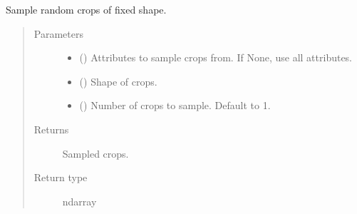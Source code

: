 \documentclass[letterpaper,10pt,english]{sphinxmanual}
\begin{document}
\begin{fulllineitems}
\begin{fulllineitems}
\label{\detokenize{api/base_classes:geology.src.base_spatial.SpatialComponent.sample_crops}}
Sample random crops of fixed shape.
\begin{quote}\begin{description}
\item[{Parameters}] \leavevmode\begin{itemize}
\item {} 
 (\sphinxstyleliteralemphasis{\sphinxupquote{, }}) \textendash{} Attributes to sample crops from. If None, use all attributes.

\item {} 
 () \textendash{} Shape of crops.

\item {} 
 (\sphinxstyleliteralemphasis{\sphinxupquote{, }}) \textendash{} Number of crops to sample. Default to 1.

\end{itemize}

\item[{Returns}] \leavevmode
{} \textendash{} Sampled crops.

\item[{Return type}] \leavevmode
ndarray

\end{description}\end{quote}

\end{fulllineitems}



\end{fulllineitems}
\end{document}
